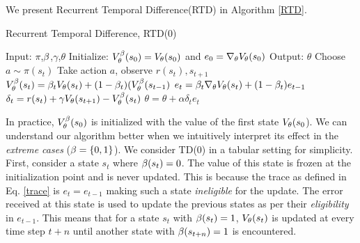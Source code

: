We present Recurrent Temporal Difference(RTD) in Algorithm \ref{RTD}.
\begin{algorithm}[H]
\caption{Recurrent Temporal Difference, RTD(0)}
\begin{algorithmic}[1]
    \label{RTD}
    \STATE Input: $\pi$,$\beta$,$\gamma$,$\theta$
    \STATE Initialize: $V^{\beta}_{\theta}(s_0) = V_{\theta}(s_0)$ and $e_0 = \nabla_{\theta} V_{\theta}(s_0)$
    \STATE Output: $\theta$
        \STATE Choose $a \sim \pi(s_t)$
        \STATE Take action $a$, observe $r(s_t),s_{t+1}$
        \STATE $V^{\beta}_{\theta}(s_t) = \beta_t V_{\theta}(s_t) + (1-\beta_t) (V^{\beta}_{\theta} (s_{t-1})$
        \STATE $e_t = \beta_t \nabla_{\theta} V_{\theta}(s_t) + (1-\beta_t) e_{t-1}$
        \STATE $\delta_t = r(s_t) + \gamma V_{\theta}(s_{t+1}) - V^{\beta}_{\theta}(s_t)$
        \STATE $\theta = \theta + \alpha \delta_t e_t $
    \ENDFOR
\end{algorithmic}
\end{algorithm}
In practice, $V^{\beta}_{\theta}(s_0)$ is initialized with the value of the first state $V_{\theta}(s_0$). We can understand our algorithm better when we intuitively interpret its effect in the \emph{extreme cases} ($\beta=\{0,1\}$). We consider TD(0) in a tabular setting for simplicity. First, consider a state $s_t$ where $\beta(s_t) = 0$. The value of this state is frozen at the initialization point and is never updated. This is because the trace as defined in Eq. \eqref{trace} is $e_t = e_{t-1}$ making such a state \emph{ineligible} for the update. The error received at this state is used to update the previous states as per their \emph{eligibility} in $e_{t-1}$. This means that for a state $s_t$ with $\beta(s_t)=1$, $V_{\theta}(s_t)$ is updated at every time step $t+n$ until another state with $\beta(s_{t+n}) = 1$ is encountered.

